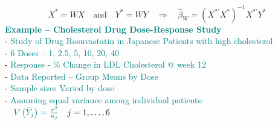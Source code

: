 \documentclass[14pt]{extarticle}
\begin{document}
\[
X^* = W X \quad \text{and} \quad Y^* = W Y \quad \Rightarrow \quad \hat{\beta}_W = (X^{*'} X^*)^{-1} X^{*'} Y^*
\]
\textbf{\textcolor{teal}{Example – Cholesterol Drug Dose-Response Study}}\\
- \textcolor{teal}{Study of Drug Rosuvastatin in Japanese Patients with high cholesterol}\\
- \textcolor{teal}{6 Doses – 1, 2.5, 5, 10, 20, 40}\\
- \textcolor{teal}{Response - \% Change in LDL Cholesterol @ week 12}\\
- \textcolor{teal}{Data Reported – Group Means by Dose}\\
- \textcolor{teal}{Sample sizes Varied by dose}\\
- \textcolor{teal}{Assuming equal variance among individual patients:}\\
$\quad \textcolor{teal}{V\left(\bar{Y}_j\right) = \frac{\sigma^2}{n_j}} \quad j = 1, \ldots, 6$
\end{document}
